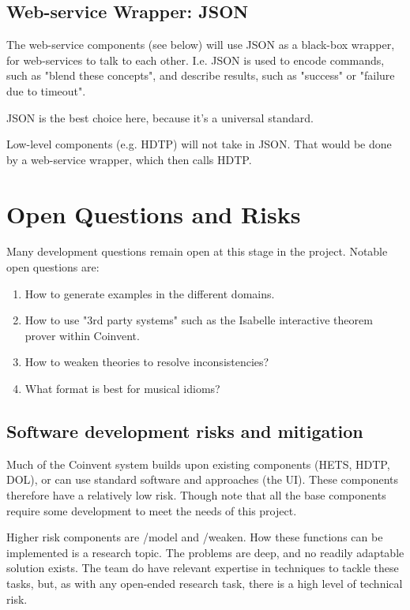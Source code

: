 \subsection{Web-service Wrapper: JSON}

The web-service components (see below) will use JSON 
as a black-box wrapper, for web-services to
talk to each other. I.e. JSON is used to encode commands, such as "blend these concepts", and describe results, such as "success" or "failure due to timeout".

JSON is the best choice here, because it's a universal standard.

Low-level components (e.g. HDTP) will not take in JSON. That would be done by a
web-service wrapper, which then calls HDTP.


\section{Open Questions and Risks}\label{sec:open}

Many development questions remain open at this stage in the project. Notable open questions are:
\begin{enumerate}
\item How to generate examples in the different domains.
\item How to use "3rd party systems" such as the Isabelle interactive theorem prover within Coinvent.
\item How to weaken theories to resolve inconsistencies?
\item What format is best for musical idioms?
\end{enumerate}

\subsection{Software development risks and mitigation}

Much of the Coinvent system builds upon existing components (HETS, HDTP, DOL), or can use standard software and approaches (the UI). These components therefore have a relatively low risk. Though note that all the base components require some development to meet the needs of this project.

Higher risk components are /model and /weaken. How these functions can be implemented is a research topic. The problems are deep, and no readily adaptable solution exists. The team do have relevant expertise in techniques to tackle these tasks, but, as with any open-ended research task, there is a high level of technical risk.

